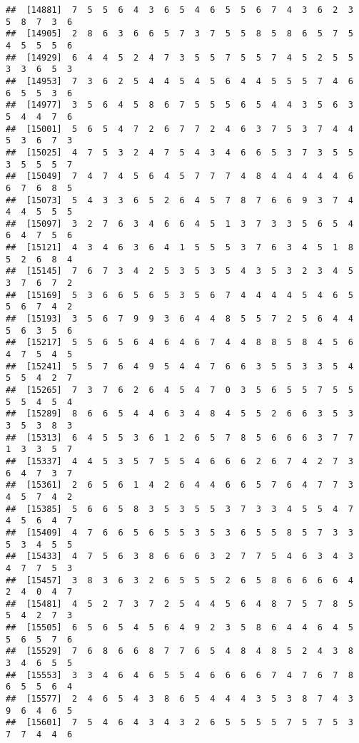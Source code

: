 \documentclass[
]{book}
\begin{document}
\begin{verbatim}
##  [14881]  7  5  5  6  4  3  6  5  4  6  5  5  6  7  4  3  6  2  3  5  8  7  3  6
##  [14905]  2  8  6  3  6  6  5  7  3  7  5  5  8  5  8  6  5  7  5  4  5  5  5  6
##  [14929]  6  4  4  5  2  4  7  3  5  5  7  5  5  7  4  5  2  5  5  3  3  6  5  3
##  [14953]  7  3  6  2  5  4  4  5  4  5  6  4  4  5  5  5  7  4  6  6  5  5  3  6
##  [14977]  3  5  6  4  5  8  6  7  5  5  5  6  5  4  4  3  5  6  3  5  4  4  7  6
##  [15001]  5  6  5  4  7  2  6  7  7  2  4  6  3  7  5  3  7  4  4  5  3  6  7  3
##  [15025]  4  7  5  3  2  4  7  5  4  3  4  6  6  5  3  7  3  5  5  3  5  5  5  7
##  [15049]  7  4  7  4  5  6  4  5  7  7  7  4  8  4  4  4  4  4  6  6  7  6  8  5
##  [15073]  5  4  3  3  6  5  2  6  4  5  7  8  7  6  6  9  3  7  4  4  4  5  5  5
##  [15097]  3  2  7  6  3  4  6  6  4  5  1  3  7  3  3  5  6  5  4  6  4  7  5  6
##  [15121]  4  3  4  6  3  6  4  1  5  5  5  3  7  6  3  4  5  1  8  5  2  6  8  4
##  [15145]  7  6  7  3  4  2  5  3  5  3  5  4  3  5  3  2  3  4  5  3  7  6  7  2
##  [15169]  5  3  6  6  5  6  5  3  5  6  7  4  4  4  4  5  4  6  5  5  6  7  4  2
##  [15193]  3  5  6  7  9  9  3  6  4  4  8  5  5  7  2  5  6  4  4  5  6  3  5  6
##  [15217]  5  5  6  5  6  4  6  4  6  7  4  4  8  8  5  8  4  5  6  4  7  5  4  5
##  [15241]  5  5  7  6  4  9  5  4  4  7  6  6  3  5  5  3  3  5  4  5  5  4  2  7
##  [15265]  7  3  7  6  2  6  4  5  4  7  0  3  5  6  5  5  7  5  5  5  5  4  5  4
##  [15289]  8  6  6  5  4  4  6  3  4  8  4  5  5  2  6  6  3  5  3  3  5  3  8  3
##  [15313]  6  4  5  5  3  6  1  2  6  5  7  8  5  6  6  6  3  7  7  1  3  3  5  7
##  [15337]  4  4  5  3  5  7  5  5  4  6  6  6  2  6  7  4  2  7  3  6  4  7  3  7
##  [15361]  2  6  5  6  1  4  2  6  4  4  6  6  5  7  6  4  7  7  3  4  5  7  4  2
##  [15385]  5  6  6  5  8  3  5  3  5  5  3  7  3  3  4  5  5  4  7  4  5  6  4  7
##  [15409]  4  7  6  6  5  6  5  5  3  5  3  6  5  5  8  5  7  3  3  5  3  4  5  5
##  [15433]  4  7  5  6  3  8  6  6  6  3  2  7  7  5  4  6  3  4  3  4  7  7  5  3
##  [15457]  3  8  3  6  3  2  6  5  5  5  2  6  5  8  6  6  6  6  4  2  4  0  4  7
##  [15481]  4  5  2  7  3  7  2  5  4  4  5  6  4  8  7  5  7  8  5  5  4  2  7  3
##  [15505]  6  5  6  5  4  5  6  4  9  2  3  5  8  6  4  4  6  4  5  5  6  5  7  6
##  [15529]  7  6  8  6  6  8  7  7  6  5  4  8  4  8  5  2  4  3  8  3  4  6  5  5
##  [15553]  3  3  4  6  4  6  5  5  4  6  6  6  6  7  4  7  6  7  8  6  5  5  6  4
##  [15577]  2  4  6  5  4  3  8  6  5  4  4  4  3  5  3  8  7  4  3  9  6  4  6  5
##  [15601]  7  5  4  6  4  3  4  3  2  6  5  5  5  5  7  5  7  5  3  7  7  4  4  6

\end{verbatim}
\end{document}
